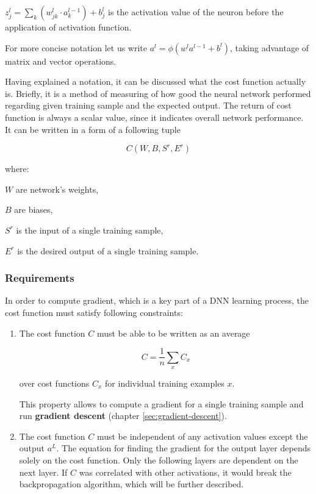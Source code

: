 $z^l_j = \sum_k (w^l_{jk} \cdot a^{l-1}_k) + b^l_j$ is the activation value of the neuron before the application of activation function.

\vspace{.5cm}

For more concise notation let us write $a^l = \phi(w^l a^{l-1} + b^l)$, taking advantage of matrix and vector operations.

Having explained a notation, it can be discussed what the cost function actually is. Briefly, it is a method of measuring of how good the neural network performed regarding given training sample and the expected output. The return of cost function is always a scalar value, since it indicates overall network performance. It can be written in a form of a following tuple

\begin{equation}
    C(W, B, S^r, E^r)
\end{equation}

where:

$W$ are network's weights,

$B$ are biases,

$S^r$ is the input of a single training sample,

$E^r$ is the desired output of a single training sample.

\newpage

\subsubsection*{Requirements}
\label{sub2:cost-requirements}

In order to compute gradient, which is a key part of a DNN learning process, the cost function must satisfy following constraints:

\begin{enumerate}
    \item The cost function $C$ must be able to be written as an average
    
        \begin{equation}
            C = \frac{1}{n} \sum_x C_x
        \end{equation}
        
        over cost functions $C_x$ for individual training examples $x$.
    
        This property allows to compute a gradient for a single training sample and run \textbf{gradient descent} (chapter \ref{sec:gradient-descent}).
    
    \item The cost function $C$ must be independent of any activation values except the output $a^L$.
    The equation for finding the gradient for the output layer depends solely on the cost function. Only the following layers are dependent on the next layer. If $C$ was correlated with other activations, it would break the backpropagation algorithm, which will be further described.
\end{enumerate}


